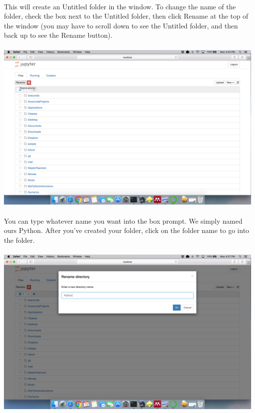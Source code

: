 \documentclass[]{article}
\begin{document}
\paragraph{}
This will create an Untitled folder in the window. To change the name of the folder, check the box next to the Untitled folder, then click Rename at the top of the window (you may have to scroll down to see the Untitled folder, and then back up to see the Rename button).
\paragraph{}
\begin{centering}
    \centerline{\includegraphics[scale=0.35]{Screenshot_18.png}}
\end{centering}

\paragraph{}
You can type whatever name you want into the box prompt. We simply named ours Python. After you've created your folder, click on the folder name to go into the folder.
\paragraph{}
\begin{centering}
    \centerline{\includegraphics[scale=0.35]{Screenshot_19.png}}
\end{centering}
\end{document}
